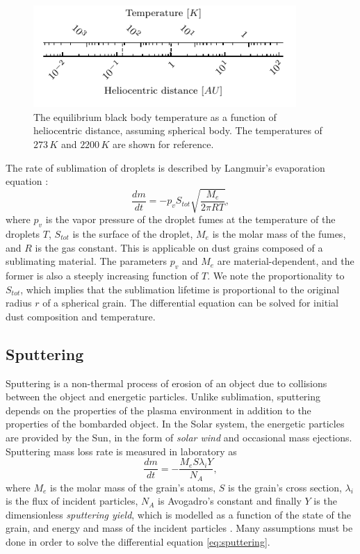 \begin{figure}[h]
 	\centering
 	\includegraphics[width=10cm]{figures/distance_temperature_ruler.pdf}
 	\caption{The equilibrium black body temperature as a function of heliocentric distance, assuming spherical body. The temperatures of $273 \, \si{K}$ and $2200 \, \si{K}$ are shown for reference.}
 	\label{fig:black_body_temperature}
\end{figure}

The rate of sublimation of droplets is described by Langmuir's evaporation equation \citep{langmuir1918evaporation}:
\begin{equation}
    \frac{dm}{dt} = -p_{v} S_{tot} \sqrt{\frac{M_e}{2\pi RT}},
\end{equation}
where $p_v$ is the vapor pressure of the droplet fumes at the temperature of the droplets $T$, $S_{tot}$ is the surface of the droplet, $M_e$ is the molar mass of the fumes, and $R$ is the gas constant. This is applicable on dust grains composed of a sublimating material. The parameters $p_v$ and $M_e$ are material-dependent, and the former is also a steeply increasing function of $T$. We note the proportionality to $S_{tot}$, which implies that the sublimation lifetime is proportional to the original radius $r$ of a spherical grain. The differential equation can be solved for initial dust composition and temperature.   

\subsection{Sputtering}

Sputtering is a non-thermal process of erosion of an object due to collisions between the object and energetic particles. Unlike sublimation, sputtering depends on the properties of the plasma environment in addition to the properties of the bombarded object. In the Solar system, the energetic particles are provided by the Sun, in the form of \textit{solar wind} and occasional mass ejections. Sputtering mass loss rate is measured in laboratory as
\begin{equation}
    \frac{dm}{dt} = - \frac{ M_e S \lambda_i Y }{N_A}, 
    \label{eq:sputtering}
\end{equation}
where $M_e$ is the molar mass of the grain's atoms, $S$ is the grain's cross section, $\lambda_i$ is the flux of incident particles, $N_A$ is Avogadro's constant and finally $Y$ is the dimensionless \textit{sputtering yield}, which is modelled as a function of the state of the grain, and energy and mass of the incident particles \citep{vyvsinka2018odpravsovani}. Many assumptions must be done in order to solve the differential equation \ref{eq:sputtering}. 

